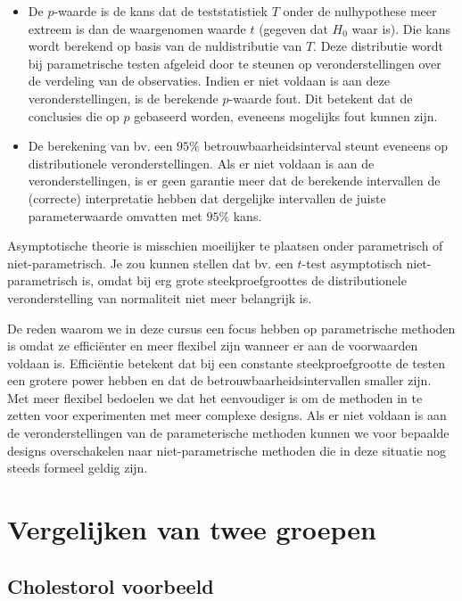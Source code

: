 \documentclass[
  12pt,dutch,coursenotes]{book}
\theoremstyle{definition}
\theoremstyle{definition}
\theoremstyle{definition}
\theoremstyle{remark}
\begin{document}
\begin{itemize}
\item
  De \(p\)-waarde is de kans dat de teststatistiek \(T\) onder de nulhypothese meer extreem is dan de waargenomen waarde \(t\) (gegeven dat \(H_0\) waar is). Die kans wordt berekend op basis van de nuldistributie van \(T\). Deze distributie wordt bij parametrische testen afgeleid door te steunen op veronderstellingen over de verdeling van de observaties. Indien er niet voldaan is aan deze veronderstellingen, is de berekende \(p\)-waarde fout. Dit betekent dat de conclusies die op \(p\) gebaseerd worden, eveneens mogelijks fout kunnen zijn.
\item
  De berekening van bv. een \(95\%\) betrouwbaarheidsinterval steunt eveneens op distributionele veronderstellingen. Als er niet voldaan is aan de veronderstellingen, is er geen garantie meer dat de berekende intervallen de (correcte) interpretatie hebben dat dergelijke intervallen de juiste parameterwaarde omvatten met \(95\%\) kans.
\end{itemize}

Asymptotische theorie is misschien moeilijker te plaatsen onder parametrisch of niet-parametrisch. Je zou kunnen stellen dat bv. een \(t\)-test asymptotisch niet-parametrisch is, omdat bij erg grote steekproefgroottes de distributionele veronderstelling van normaliteit niet meer belangrijk is.

De reden waarom we in deze cursus een focus hebben op parametrische methoden is omdat ze efficiënter en meer flexibel zijn wanneer er aan de voorwaarden voldaan is. Efficiëntie betekent dat bij een constante steekproefgrootte de testen een grotere power hebben en dat de betrouwbaarheidsintervallen smaller zijn. Met meer flexibel bedoelen we dat het eenvoudiger is om de methoden in te zetten voor experimenten met meer complexe designs.
Als er niet voldaan is aan de veronderstellingen van de parameterische methoden kunnen we voor bepaalde designs overschakelen naar niet-parametrische methoden die in deze situatie nog steeds formeel geldig zijn.

\hypertarget{vergelijken-van-twee-groepen}{%
\section{Vergelijken van twee groepen}\label{vergelijken-van-twee-groepen}}

\hypertarget{cholestorol-voorbeeld}{%
\subsection{Cholestorol voorbeeld}\label{cholestorol-voorbeeld}}
\end{document}

